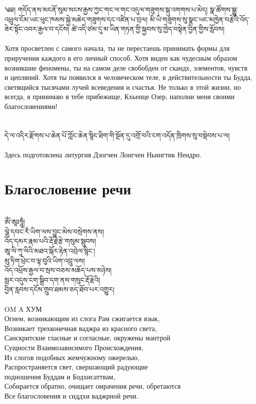 \small
\ti
༄༅། གདོད་ནས་མངནོ་སུམ་སངས་རྒྱས་ཀྱང་གང་ལ་གང་འདུལ་གཟུགས་སྐུ་འགགས་པ་མེད།
སྣ་ཚོགས་སྒྱུ་འཕྲུལ་ངོམ་ཡང་ཕུང་ཁམས་སྐྱེ་མཆེད་གཟུགས་དང་འཛིན་པ་བྲལ།
མི་ཡི་གཟུགས་སུ་སྣང་ཡང་མཁྱེན་བརྩེའི་འོད་ཟེར་སྟོང་འབར་རྒྱལ་བ་དངོས།
ཚེ་འདི་ཙམ་དུ་མ་ཡིན་གཏན་གྱི་སྐྱབས་སུ་ཁྱེད་བསྟེན་བྱིན་གྱིས་རློབས།\\
\\
\ru
Хотя просветлен с самого начала, ты не перестаешь принимать
формы для приручения каждого в его личный способ.
Хотя виден как чудесным образом возникшие феномены,
ты на самом деле свобобден от скандх, элементов, чувств и цепляний.
Хотя ты появился в человеческом теле, в действительности ты Будда,
светящийся тысячами лучей всеведения и счастья.
Не только в этой жизни, но всегда, я принимаю в тебе прибежище,
Кхьенце Озер, наполни меня своими благословениями!\\
\\
\vspace{0.5cm}
\\
\scriptsize
\ti དེ་ལ་འདིར་རྫོགས་པ་ཆེན་པོ་ཀློང་ཆེན་སྙིང་ཐིག་གི་སྔོན་དུ་འགྲོ་བའི་ངག་འདོན་ཁྲིགས་སུ་བསྡེབས་པ་ལ།\\
\\
\ru Здесь подготовлена литургия Дзогчен Лонгчен Ньингтик Нендро.\\


\normalsize
\newpage
\section*{Благословение речи}
\\
\ti
ཨོཾ་ཨཱཿཧཱུྂ།\\
ལྕེ་དབང་རྂ་ཡིག་ལས་བྱུང་མེས་བསྲེགས་ནས། \\
འོད་དམར་རྣམ་པའི་རྡོ་རྗེ་རྩེ་གསུམ་སྦུབས།\\
ཨཱ་ལི་ཀཱ་ལིའི་མཐའ་སྐོར་རྟེན་འབྲེལ་སྙིང་།\\
མུ་ཏིག་ཕྲེང་བ་ལྟ་བུའི་ཡིག་འབྲུ་ལས།\\
འོད་འཕྲོས་རྒྱལ་བ་སྲས་བཅས་མཆོད་པས་མཉེས།\\
སླར་འདུས་ངག་སྒྲིབ་དག་ནས་གསུང་རྡོ་རྗེའི།\\
བྱིན་རླབས་དངོས་གྲུབ་ཐམས་ཅད་ཐོབ་པར་འགྱུར།\\
\\
\ru
OM A ХУМ \\
Огнем, возникающим из слога Рам сжигается язык,\\
Возникает трехконечная ваджра из красного света,\\
Санскритские гласные и согласные, окружены мантрой\\
Сущности Взаимозависимого Происхождения,\\
Из слогов подобных жемчужному ожерелью,\\
Распространяется свет, свершающий радующие \\
подношения Буддам и Бодхисаттвам,\\
Собирается обратно, очищает омрачения речи, обретаются\\
Все благословения и сиддхи ваджрной речи.
\newpage
